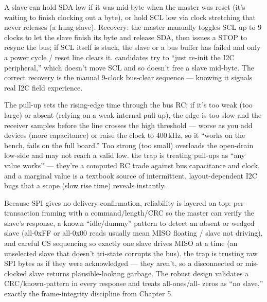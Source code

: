 A slave can hold SDA low if it was mid-byte when the master was reset (it's
waiting to finish clocking out a byte), or hold SCL low via clock stretching
that never releases (a hung slave). Recovery: the master manually toggles SCL up
to 9 clocks to let the slave finish its byte and release SDA, then issues a STOP
to resync the bus; if SCL itself is stuck, the slave or a bus buffer has failed
and only a power cycle / reset line clears it. \trap candidates try to ``just
re-init the I2C peripheral,'' which doesn't move SCL and so doesn't free a slave
mid-byte. The correct recovery is the manual 9-clock bus-clear sequence ---
knowing it signals real I2C field experience.

The pull-up sets the rising-edge time through the bus RC; if it's too weak (too
large) or absent (relying on a weak internal pull-up), the edge is too slow and
the receiver samples before the line crosses the high threshold --- worse as you
add devices (more capacitance) or raise the clock to 400\,kHz, so it ``works on
the bench, fails on the full board.'' Too strong (too small) overloads the
open-drain low-side and may not reach a valid low. \trap the trap is treating
pull-ups as ``any value works'' --- they're a computed RC trade against bus
capacitance and clock, and a marginal value is a textbook source of
intermittent, layout-dependent I2C bugs that a scope (slow rise time) reveals
instantly.

Because SPI gives no delivery confirmation, reliability is layered on top:
per-transaction framing with a command/length/CRC so the master can verify the
slave's response, a known ``idle/dummy'' pattern to detect an absent or wedged
slave (all-0xFF or all-0x00 reads usually mean MISO floating / slave not
driving), and careful CS sequencing so exactly one slave drives MISO at a time
(an unselected slave that doesn't tri-state corrupts the bus). \trap the trap is
trusting raw SPI bytes as if they were acknowledged --- they aren't, so a
disconnected or mis-clocked slave returns plausible-looking garbage. The robust
design validates a CRC/known-pattern in every response and treats all-ones/all-
zeros as ``no slave,'' exactly the frame-integrity discipline from Chapter 5.

